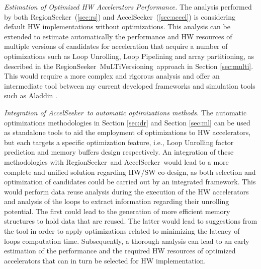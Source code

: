 \documentclass[]{usiinfthesis}
\newcommand{\aseeker}{{AccelSeeker}}
\newcommand{\rseeker}{{RegionSeeker}}
\newcommand{\multi}{MuLTiVersioning}
\begin{document}
\emph{Estimation of Optimized HW Accelerators Performance.} 
 The analysis performed by both \rseeker\ (\ref{sec:rs}) and \aseeker\ (\ref{sec:accel}) is 
considering default HW implementations without optimizations. This analysis can be 
extended to estimate automatically the performance and HW resources of multiple versions of candidates for acceleration that acquire a number of optimizations such as Loop Unrolling, Loop Pipelining and
array partitioning, as described in the \rseeker\ \multi\ approach in Section \ref{sec:multi}. This 
would require a more complex and rigorous analysis and offer an intermediate tool between my current 
developed frameworks and simulation tools such as Aladdin \cite{ShaoJul14}.

\emph{Integration of \aseeker\ to automatic optimizations methods.}
The automatic optimizations methodologies in Section \ref{sec:dr} and Section \ref{sec:ml} can be used
as standalone tools to aid the employment of optimizations to HW accelerators, but each targets a specific
optimization feature, i.e., Loop Unrolling factor prediction and memory buffers design respectively. An 
integration of these methodologies with \rseeker\ and \aseeker\ would lead to a more complete and unified 
solution regarding HW/SW co-design, as both selection and optimization of candidates could be carried out 
by an integrated framework. This would perform
data reuse analysis during the execution of the HW accelerators and analysis of the loops 
to extract information regarding their unrolling potential. The first could lead to 
the generation of more efficient memory structures to hold data that are reused. The latter would lead to 
suggestions from the tool in order to apply optimizations related to minimizing the latency of loops 
computation time. Subsequently, a thorough analysis can lead to an early estimation of the performance and the 
required HW resources of optimized accelerators that can in turn be selected for HW implementation.\par
\end{document}
